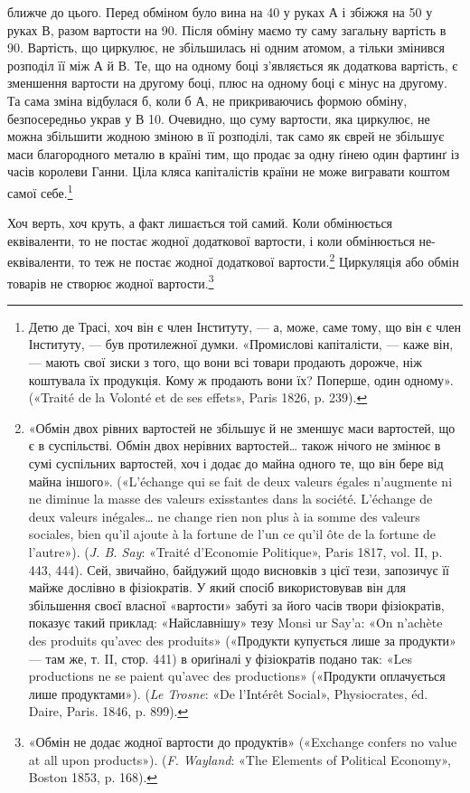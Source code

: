 \parcont{}  %
ближче до цього. Перед обміном було вина на 40
у руках $А$ і збіжжя на 50 у руках $В$, разом
вартости на 90. Після обміну маємо ту саму
загальну вартість в 90. Вартість, що циркулює,
не збільшилась ні одним атомом, а тільки змінився розподіл її
між $А$ й $В$. Те, що на одному боці з’являється як додаткова вартість,
є зменшення вартости на другому боці, плюс на одному
боці є мінус на другому. Та сама зміна відбулася б, коли б $А$, не
прикриваючись формою обміну, безпосередньо украв у $В$ 10. Очевидно, що суму вартости, яка циркулює, не
можна збільшити жодною зміною в її розподілі, так само як єврей
не збільшує маси благородного металю в країні тим, що продає
за одну ґінею один фартинґ із часів королеви Ганни. Ціла
кляса капіталістів країни не може вигравати коштом самої себе.\footnote{
Детю де Трасі, хоч він є член Інституту, — а, може, саме тому,
що він є член Інституту, — був протилежної думки. «Промислові капіталісти,
— каже він, — мають свої зиски з того, що вони всі товари продають
дорожче, ніж коштувала їх продукція. Кому ж продають вони їх?
Поперше, один одному». («Traité de la Volonté et de ses effets», Paris
1826, p. 239).
}

Хоч верть, хоч круть, а факт лишається той самий. Коли обмінюється
еквіваленти, то не постає жодної додаткової вартости,
і коли обмінюється не-еквіваленти, то теж не постає жодної додаткової
вартости.\footnote{
«Обмін двох рівних вартостей не збільшує й не зменшує маси вартостей,
що є в суспільстві. Обмін двох нерівних вартостей\dots{} також нічого
не змінює в сумі суспільних вартостей, хоч і додає до майна одного те,
що він бере від майна іншого». («L’échange qui se fait de deux valeurs
égales n’augmente ni ne diminue la masse des valeurs exisstantes dans la
société. L’échange de deux valeurs inégales\dots{} ne change rien non plus à ia
somme des valeurs sociales, bien qu’il ajoute à la fortune de l’un ce qu’il
ôte de la fortune de l’autre»). (\emph{J. B. Say}: «Traité d’Economie Politique»,
Paris 1817, vol. II, p. 443, 444). Сей, звичайно, байдужий щодо висновків
з цієї тези, запозичує її майже дослівно в фізіократів. У який спосіб використовував
він для збільшення своєї власної «вартости» забуті за його
часів твори фізіократів, показує такий приклад: «Найславнішу» тезу
Monsi ur Say’a: «On n’achète des produits qu’avec des produits» («Продукти
купується лише за продукти» — там же, т. II, стор. 441) в ориґіналі
у фізіократів подано так: «Les productions ne se paient qu’avec des
productions» («Продукти оплачується лише продуктами»). (\emph{Le Trosne}:
«De l’Intérêt Social», Physiocrates, éd. Daire, Paris. 1846, p. 899).
} Циркуляція або обмін товарів не створює
жодної вартости.\footnote{
«Обмін не додає жодної вартости до продуктів» («Exchange confers
no value at all upon products»). (\emph{F. Wayland}: «The Elements of Political
Economy», Boston 1853, p. 168).
}

